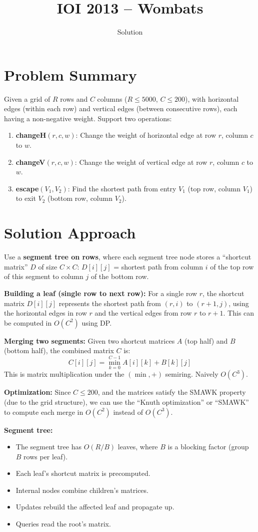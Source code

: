 \documentclass[11pt,a4paper]{article}
\title{IOI 2013 -- Wombats}
\author{Solution}
\date{}
\begin{document}
\maketitle

\section{Problem Summary}
Given a grid of $R$ rows and $C$ columns ($R \leq 5000$, $C \leq 200$), with horizontal edges (within each row) and vertical edges (between consecutive rows), each having a non-negative weight. Support two operations:
\begin{enumerate}
    \item \textbf{changeH}$(r, c, w)$: Change the weight of horizontal edge at row $r$, column $c$ to $w$.
    \item \textbf{changeV}$(r, c, w)$: Change the weight of vertical edge at row $r$, column $c$ to $w$.
    \item \textbf{escape}$(V_1, V_2)$: Find the shortest path from entry $V_1$ (top row, column $V_1$) to exit $V_2$ (bottom row, column $V_2$).
\end{enumerate}

\section{Solution Approach}
Use a \textbf{segment tree on rows}, where each segment tree node stores a ``shortcut matrix'' $D$ of size $C \times C$: $D[i][j]$ = shortest path from column $i$ of the top row of this segment to column $j$ of the bottom row.

\textbf{Building a leaf (single row to next row):}
For a single row $r$, the shortcut matrix $D[i][j]$ represents the shortest path from $(r, i)$ to $(r+1, j)$, using the horizontal edges in row $r$ and the vertical edges from row $r$ to $r+1$. This can be computed in $O(C^2)$ using DP.

\textbf{Merging two segments:}
Given two shortcut matrices $A$ (top half) and $B$ (bottom half), the combined matrix $C$ is:
\[
C[i][j] = \min_{k=0}^{C-1} A[i][k] + B[k][j]
\]
This is matrix multiplication under the $(\min, +)$ semiring. Naively $O(C^3)$.

\textbf{Optimization:} Since $C \leq 200$, and the matrices satisfy the SMAWK property (due to the grid structure), we can use the ``Knuth optimization'' or ``SMAWK'' to compute each merge in $O(C^2)$ instead of $O(C^3)$.

\textbf{Segment tree:}
\begin{itemize}
    \item The segment tree has $O(R / B)$ leaves, where $B$ is a blocking factor (group $B$ rows per leaf).
    \item Each leaf's shortcut matrix is precomputed.
    \item Internal nodes combine children's matrices.
    \item Updates rebuild the affected leaf and propagate up.
    \item Queries read the root's matrix.
\end{itemize}
\end{document}

